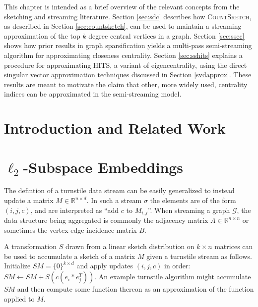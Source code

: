\documentclass{report}
\newcommand{\algoname}[1]{\textnormal{\textsc{#1}}}
\begin{document}
This chapter is intended as a brief overview of the relevant concepts from the sketching and streaming literature. 
Section \ref{sec:sdc} describes how \algoname{CountSketch}, as described in Section \ref{sec:countsketch}, can be used to maintain a streaming approximation of the top $k$ degree central vertices in a graph. 
Section \ref{sec:sscc} shows how prior results in graph sparsification yields a multi-pass semi-streaming algorithm for approximating closeness centrality. 
Section \ref{sec:sshits} explains a procedure for approximating HITS, a variant of eigencentrality, using the direct singular vector approximation techniques discussed in Section \ref{svdapprox}.
These results are meant to motivate the claim that other, more widely used, centrality indices can be approximated in the semi-streaming model.

\section{Introduction and Related Work} \label{hits:sec:intro}




\section{$\ell_2$-Subspace Embeddings} \label{hits:sec:subspace}

The defintion of a turnstile data stream can be easily generalized to instead update a matrix $M \in \mathbb{R}^{n \times d}$.
In such a stream $\sigma$ the elements are of the form $(i,j,c)$, and are interpreted as ``add $c$ to $M_{i,j}$''. 
When streaming a graph $\mathcal{G}$, the data structure being aggregated is commonly the adjacency matrix $A \in \mathbb{R}^{n \times n}$ or sometimes the vertex-edge incidence matrix $B$. 

A transformation $S$ drawn from a linear sketch distribution on $k \times n$ matrices can be used to accumulate a sketch of a matrix $M$ given a turnstile stream as follows.
Initialize $SM = \{0\}^{k \times d}$ and apply updates $(i,j,c)$ in order: $SM \gets SM + S(c(e_i*e_j^T))$.
An example turnstile algorithm might accumulate $SM$ and then compute some function thereon as an approximation of the function applied to $M$. 
\end{document}
